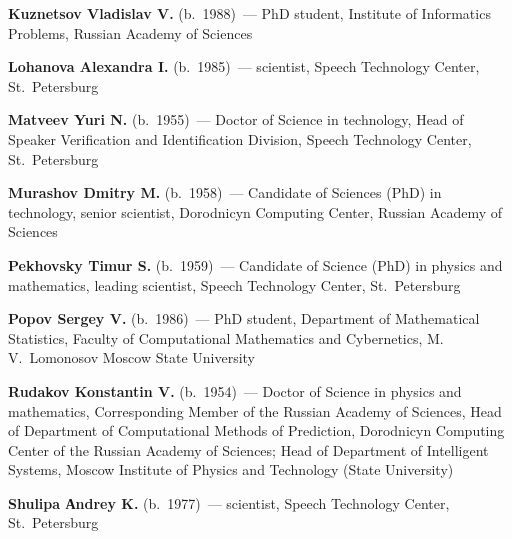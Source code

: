 \begin{multicols}{2}
\noindent
\textbf{Kuznetsov Vladislav V.} (b.\ 1988)~--- PhD student, 
Institute of Informatics Problems, Russian Academy of Sciences 

\vspace*{5pt}

\noindent
\textbf{Lohanova Alexandra I.} (b.\ 1985)~--- scientist,
 Speech Technology Center, St.~Petersburg

\vspace*{5pt}

\noindent
\textbf{Matveev Yuri N.} (b.\ 1955)~--- Doctor of Science in technology, Head of 
Speaker Verification and Identification Division, Speech Technology Center, St.~Petersburg

\vspace*{5pt}

\noindent
\textbf{Murashov Dmitry M.} (b.\ 1958)~--- Candidate of Sciences (PhD) in technology, 
senior scientist, Dorodnicyn Computing Center, Russian Academy of Sciences

\vspace*{5pt}

\noindent
\textbf{Pekhovsky Timur S.} (b.\ 1959)~--- Candidate of Science (PhD) in physics and mathematics, 
leading scientist, Speech Technology Center, St.~Petersburg

\vspace*{5pt}

\noindent
\textbf{Popov Sergey V.} (b.\ 1986)~--- PhD student, Department 
of Mathematical Statistics, Faculty of Computational Mathematics 
and Cybernetics, M.\,V.~Lomonosov Moscow State University

\vspace*{5pt}

\noindent
\textbf{Rudakov Konstantin V.} (b.\ 1954)~--- Doctor of Science in physics and mathematics, 
Corresponding Member of the Russian Academy of Sciences, 
Head of Department of Computational Methods of Prediction, 
Dorodnicyn Computing Center of the Russian Academy of Sciences; 
Head of Department of Intelligent Systems, Moscow Institute of
Physics and Technology (State University)



\vspace*{6pt}

\noindent
\textbf{Shulipa Аndrey K.} (b.\ 1977)~--- scientist, 
 Speech Technology Center, St.~Petersburg


\vspace*{4pt}


\end{multicols}

